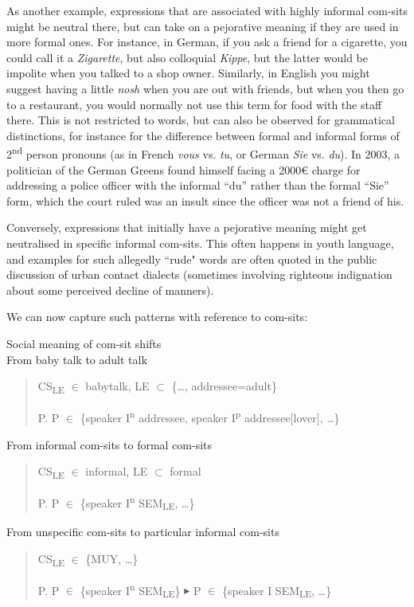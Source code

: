 As another example, expressions that are associated with highly informal com-sits might be neutral there, but can take on a pejorative meaning if they are used in more formal ones. For instance, in German, if you ask a friend for a cigarette, you could call it a \textit{Zigarette}, but also colloquial \textit{Kippe}, but the latter would be impolite when you talked to a shop owner. Similarly, in English you might suggest having a little \textit{nosh} when you are out with friends, but when you then go to a restaurant, you would normally not use this term for food with the staff there. This is not restricted to words, but can also be observed for grammatical distinctions, for instance for the difference between formal and informal forms of 2\textsuperscript{nd} person pronouns (as in French \textit{vous} vs. \textit{tu}, or German \textit{Sie} vs. \textit{du}). In 2003, a politician of the German Greens found himself facing a 2000€ charge for addressing a police officer with the informal “du” rather than the formal “Sie” form, which the court ruled was an insult since the officer was not a friend of his.

Conversely, expressions that initially have a pejorative meaning might get neutralised in specific informal com-sits. This often happens in youth language, and examples for such allegedly “rude" words are often quoted in the public discussion of urban contact dialects (sometimes involving righteous indignation about some perceived decline of manners).

We can now capture such patterns with reference to com-sits:

\ea
{\label{bkm:Ref121480625}Social meaning of com-sit shifts}\\
\ea
From baby talk to adult talk\\
\begin{quote}
  CS\textsubscript{LE} ${\in}$ babytalk, LE $\subset$ \{…, addressee=adult\} {\textbar}

  P. P ${\in}$ \{speaker I\textsuperscript{n} addressee, speaker I\textsuperscript{p} addressee[lover], …\}
\end{quote}
  \ex
From informal com-sits to formal com-sits\\
\begin{quote}
  CS\textsubscript{LE} ${\in}$ informal, LE $\subset$ formal {\textbar}

  P. P ${\in}$ \{speaker I\textsuperscript{n} SEM\textsubscript{LE}, …\}
\end{quote}
  \ex
From unspecific com-sits to particular informal com-sits\\
\begin{quote}
  CS\textsubscript{LE} ${\in}$ \{MUY, …\} {\textbar}

  P. P ${\in}$ \{speaker I\textsuperscript{n} SEM\textsubscript{LE}\} ${\blacktriangleright}$ P ${\in}$ \{speaker I SEM\textsubscript{LE}, …\}
  \end{quote}
\z
\z

